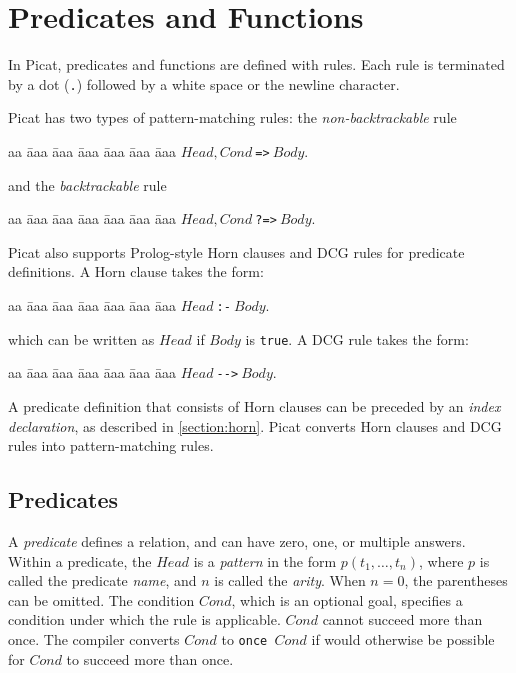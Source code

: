 \chapter{\label{chapter:predicates}Predicates and Functions}
In Picat, predicates and functions are defined with rules. Each rule is terminated by a dot (\verb+.+) followed by a white space or the newline character.

Picat has two types of pattern-matching rules: the \emph{non-backtrackable} rule 
\begin{tabbing}
aa \= aaa \= aaa \= aaa \= aaa \= aaa \= aaa \kill
\> \> $Head, Cond\ $\verb+=>+$\ Body$. 
\end{tabbing}
and the \emph{backtrackable} rule 
\begin{tabbing}
aa \= aaa \= aaa \= aaa \= aaa \= aaa \= aaa \kill
\> \> $Head, Cond\ $\verb+?=>+$\ Body$. 
\end{tabbing}
Picat also supports Prolog-style Horn clauses  and DCG rules  for predicate definitions. A Horn clause takes the form:
\begin{tabbing}
aa \= aaa \= aaa \= aaa \= aaa \= aaa \= aaa \kill
\> \> $Head\ $\verb+:-+$\ Body$. 
\end{tabbing}
which can be written as $Head$ if $Body$ is \texttt{true}. A DCG rule takes the form:
\begin{tabbing}
aa \= aaa \= aaa \= aaa \= aaa \= aaa \= aaa \kill
\> \> $Head\ $\verb+-->+$\ Body$. 
\end{tabbing}
A predicate definition that consists of Horn clauses can be preceded by an \emph{index declaration}, as described in \ref{section:horn}. Picat converts Horn clauses and DCG rules into pattern-matching rules.

\section{Predicates}
A \emph{predicate} defines a relation, and can have zero, one, or multiple answers. Within a predicate, the $Head$ is a \emph{pattern} in the form $p(t_1,\ldots,t_n)$, where $p$ is called the predicate \emph{name}, and $n$ is called the \emph{arity}. When $n=0$, the parentheses can be omitted. The condition $Cond$, which is an optional goal, specifies a condition under which the rule is applicable. $Cond$ cannot succeed more than once. The compiler converts $Cond$ to \texttt{once $Cond$} if would otherwise be possible for $Cond$ to succeed more than once.

